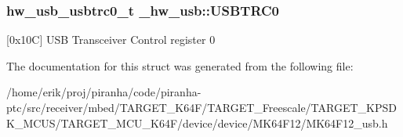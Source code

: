 \subsubsection[{\texorpdfstring{U\+S\+B\+T\+R\+C0}{USBTRC0}}]{ {\bf hw\+\_\+usb\+\_\+usbtrc0\+\_\+t} \+\_\+hw\+\_\+usb\+::\+U\+S\+B\+T\+R\+C0}\hypertarget{struct__hw__usb_a99bb46d5519be3d10cb467e306e56935}{}\label{struct__hw__usb_a99bb46d5519be3d10cb467e306e56935}
\mbox{[}0x10C\mbox{]} U\+SB Transceiver Control register 0 

The documentation for this struct was generated from the following file\+:\begin{DoxyCompactItemize}
\item 
/home/erik/proj/piranha/code/piranha-\/ptc/src/receiver/mbed/\+T\+A\+R\+G\+E\+T\+\_\+\+K64\+F/\+T\+A\+R\+G\+E\+T\+\_\+\+Freescale/\+T\+A\+R\+G\+E\+T\+\_\+\+K\+P\+S\+D\+K\+\_\+\+M\+C\+U\+S/\+T\+A\+R\+G\+E\+T\+\_\+\+M\+C\+U\+\_\+\+K64\+F/device/device/\+M\+K64\+F12/M\+K64\+F12\+\_\+usb.\+h\end{DoxyCompactItemize}
